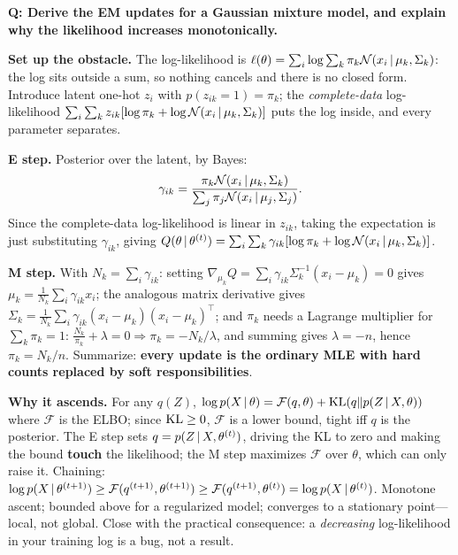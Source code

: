\begin{interviewq}
\textbf{Q: Derive the EM updates for a Gaussian mixture model, and explain why the likelihood increases monotonically.}

 \quad {} \quad \badgefreq{\freqhigh}

\stronganswer

\textbf{Set up the obstacle.} The log-likelihood is $\ell(\theta) = \sum_i \log \sum_k \pi_k \mathcal{N}(x_i \,|\, \mu_k, \Sigma_k)$: the log sits outside a sum, so nothing cancels and there is no closed form. Introduce latent one-hot $z_i$ with $p(z_{ik}=1) = \pi_k$; the \emph{complete-data} log-likelihood $\sum_i\sum_k z_{ik}[\log\pi_k + \log\mathcal{N}(x_i\,|\,\mu_k,\Sigma_k)]$ puts the log inside, and every parameter separates.

\textbf{E step.} Posterior over the latent, by Bayes:
\begin{equation*}
\gamma_{ik} = \frac{\pi_k \mathcal{N}(x_i \,|\, \mu_k,\Sigma_k)}{\sum_j \pi_j \mathcal{N}(x_i \,|\, \mu_j,\Sigma_j)} .
\end{equation*}
Since the complete-data log-likelihood is linear in $z_{ik}$, taking the expectation is just substituting $\gamma_{ik}$, giving $Q(\theta\,|\,\theta^{(t)}) = \sum_i\sum_k \gamma_{ik}[\log\pi_k + \log\mathcal{N}(x_i\,|\,\mu_k,\Sigma_k)]$.

\textbf{M step.} With $N_k = \sum_i \gamma_{ik}$: setting $\nabla_{\mu_k}Q = \sum_i \gamma_{ik}\Sigma_k^{-1}(x_i-\mu_k) = 0$ gives $\mu_k = \frac{1}{N_k}\sum_i \gamma_{ik}x_i$; the analogous matrix derivative gives $\Sigma_k = \frac{1}{N_k}\sum_i \gamma_{ik}(x_i-\mu_k)(x_i-\mu_k)^\top$; and $\pi_k$ needs a Lagrange multiplier for $\sum_k \pi_k = 1$: $\frac{N_k}{\pi_k}+\lambda = 0 \Rightarrow \pi_k = -N_k/\lambda$, and summing gives $\lambda = -n$, hence $\pi_k = N_k/n$. Summarize: \textbf{every update is the ordinary MLE with hard counts replaced by soft responsibilities}.

\textbf{Why it ascends.} For any $q(Z)$, $\log p(X\,|\,\theta) = \mathcal{F}(q,\theta) + \operatorname{KL}(q \| p(Z\,|\, X,\theta))$ where $\mathcal{F}$ is the ELBO; since $\operatorname{KL} \ge 0$, $\mathcal{F}$ is a lower bound, tight iff $q$ is the posterior. The E step sets $q = p(Z\,|\, X,\theta^{(t)})$, driving the KL to zero and making the bound \textbf{touch} the likelihood; the M step maximizes $\mathcal{F}$ over $\theta$, which can only raise it. Chaining: $\log p(X\,|\,\theta^{(t+1)}) \ge \mathcal{F}(q^{(t+1)},\theta^{(t+1)}) \ge \mathcal{F}(q^{(t+1)},\theta^{(t)}) = \log p(X\,|\,\theta^{(t)})$. Monotone ascent; bounded above for a regularized model; converges to a stationary point---local, not global. Close with the practical consequence: a \emph{decreasing} log-likelihood in your training log is a bug, not a result.


\end{interviewq}

